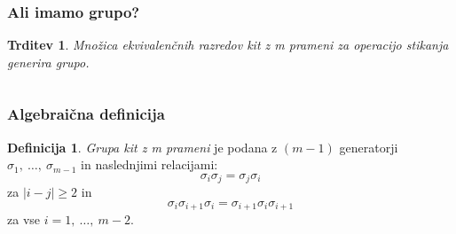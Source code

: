 \documentclass[9pt, table]{beamer}
\newtheorem{trd}{Trditev}
\theoremstyle{remark}
\theoremstyle{definition}
\newtheorem{defi}{Definicija}
\begin{document}
\begin{frame}
\frametitle{Ali imamo grupo?}
\pause
\begin{trd}
Množica ekvivalenčnih razredov kit z m prameni za operacijo stikanja generira grupo.
\end{trd}
\begin{columns}
\begin{column}{5cm}
\end{column}
\begin{column}{5cm}
\end{column}
\end{columns}
\end{frame}

\begin{frame}
\frametitle{Algebraična definicija}
\begin{defi}
\emph{Grupa kit z m prameni} je podana z $(m-1)$ generatorji $\sigma_1,\ \ldots,\ \sigma_{m-1}$ in naslednjimi relacijami: $$\sigma_i \sigma_j = \sigma_j \sigma_i$$ za $|i - j| \geq 2$ in $$\sigma_i \sigma_{i+1} \sigma_i= \sigma_{i+1} \sigma_i \sigma_{i+1}$$ za vse $i = 1,\ \ldots,\ m-2$.
\end{defi}
\end{frame}
\end{document}
